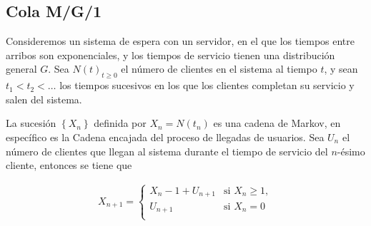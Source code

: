 \documentclass{article}
\numberwithin{equation}{section}
\begin{document}
\subsection{Cola M/G/1}
%
Consideremos un sistema de espera con un servidor, en el que los tiempos entre arribos son exponenciales, y los tiempos de servicio tienen una distribuci\'on general $G$. Sea $N\left(t\right)_{t\geq0}$ el n\'umero de clientes en el sistema al tiempo $t$, y sean $t_{1}<t_{2}<\dots$ los tiempos sucesivos en los que los clientes completan su servicio y salen del sistema.

La sucesi\'on $\left\{X_{n}\right\}$ definida por
$X_{n}=N\left(t_{n}\right)$ es una cadena de Markov, en espec\'ifico es la Cadena encajada del proceso de llegadas de usuarios. Sea $U_{n}$ el n\'umero de clientes que llegan al sistema durante el tiempo de servicio del $n$-\'esimo cliente, entonces se tiene que

\begin{eqnarray*}
X_{n+1}=\left\{\begin{array}{cc}
X_{n}-1+U_{n+1} & \textrm{si }X_{n}\geq1,\\
U_{n+1} & \textrm{si }X_{n}=0\\
\end{array}\right.
\end{eqnarray*}
\end{document}
